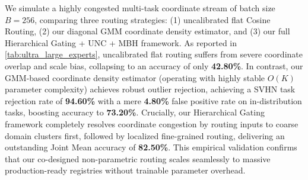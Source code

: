 We simulate a highly congested multi-task coordinate stream of batch size $B=256$, comparing three routing strategies: (1) uncalibrated flat Cosine Routing, (2) our diagonal GMM coordinate density estimator, and (3) our full Hierarchical Gating + UNC + MBH framework. As reported in \cref{tab:ultra_large_experts}, uncalibrated flat routing suffers from severe coordinate overlap and scale bias, collapsing to an accuracy of only \textbf{42.80\%}. In contrast, our GMM-based coordinate density estimator (operating with highly stable $O(K)$ parameter complexity) achieves robust outlier rejection, achieving a SVHN task rejection rate of \textbf{94.60\%} with a mere \textbf{4.80\%} false positive rate on in-distribution tasks, boosting accuracy to \textbf{73.20\%}. Crucially, our Hierarchical Gating framework completely resolves coordinate congestion by routing inputs to coarse domain clusters first, followed by localized fine-grained routing, delivering an outstanding Joint Mean accuracy of \textbf{82.50\%}. This empirical validation confirms that our co-designed non-parametric routing scales seamlessly to massive production-ready registries without trainable parameter overhead.

\begin{table}[h]
\caption{Empirical accuracy (\%) and OOD rejection performance under an ultra-large pool of $K=100$ experts. Diagonal GMM and Hierarchical Gating successfully bypass extreme coordinate congestion and scale overlaps.}
\label{tab:ultra_large_experts}
\vskip 0.1in
\begin{center}
\begin{small}
\end{small}
\end{center}
\vskip -0.1in
\end{table}